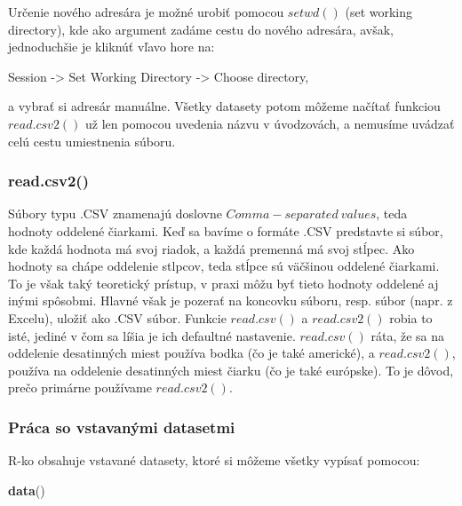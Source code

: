 \documentclass[]{article}
\newenvironment{Shaded}{\begin{snugshade}}{\end{snugshade}}
\newcommand{\KeywordTok}[1]{\textcolor[rgb]{0.13,0.29,0.53}{\textbf{#1}}}
\newcommand{\NormalTok}[1]{#1}
\begin{document}
Určenie nového adresára je možné urobiť pomocou \(setwd()\) (set working
directory), kde ako argument zadáme cestu do nového adresára, avšak,
jednoduchšie je kliknúť vľavo hore na:

\begin{center}

Session -\textgreater{} Set Working Directory -\textgreater{} Choose
directory,

\end{center}

a vybrať si adresár manuálne. Všetky datasety potom môžeme načítať
funkciou \(read.csv2()\) už len pomocou uvedenia názvu v úvodzovách, a
nemusíme uvádzať celú cestu umiestnenia súboru.

\hypertarget{read.csv2}{%
\subsubsection{read.csv2()}\label{read.csv2}}

Súbory typu .CSV znamenajú doslovne \(Comma-separated \ values\), teda
hodnoty oddelené čiarkami. Keď sa bavíme o formáte .CSV predstavte si
súbor, kde každá hodnota má svoj riadok, a každá premenná má svoj
stĺpec. Ako hodnoty sa chápe oddelenie stlpcov, teda stĺpce sú väčšinou
oddelené čiarkami. To je však taký teoretický prístup, v praxi môžu byť
tieto hodnoty oddelené aj inými spôsobmi. Hlavné však je pozerať na
koncovku súboru, resp. súbor (napr. z Excelu), uložiť ako .CSV súbor.
Funkcie \(read.csv()\) a \(read.csv2()\) robia to isté, jediné v čom sa
líšia je ich defaultné nastavenie. \(read.csv()\) ráta, že sa na
oddelenie desatinných miest používa bodka (čo je také americké), a
\(read.csv2()\), používa na oddelenie desatinných miest čiarku (čo je
také európske). To je dôvod, prečo primárne používame \(read.csv2()\).

\hypertarget{pruxe1ca-so-vstavanuxfdmi-datasetmi}{%
\subsubsection{Práca so vstavanými
datasetmi}\label{pruxe1ca-so-vstavanuxfdmi-datasetmi}}

R-ko obsahuje vstavané datasety, ktoré si môžeme všetky vypísať pomocou:

\begin{Shaded}
\begin{Highlighting}[]
\KeywordTok{data}\NormalTok{()}
\end{Highlighting}
\end{Shaded}
\end{document}

